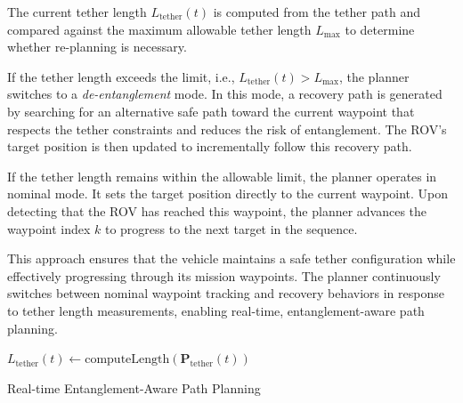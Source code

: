 The current tether length \(L_{\text{tether}}(t)\) is computed from the tether path and compared against the maximum allowable tether length \(L_{\max}\) to determine whether re-planning is necessary.

If the tether length exceeds the limit, i.e., \( L_{\text{tether}}(t) > L_{\max} \), the planner switches to a \emph{de-entanglement} mode. In this mode, a recovery path is generated by searching for an alternative safe path toward the current waypoint that respects the tether constraints and reduces the risk of entanglement. The ROV’s target position is then updated to incrementally follow this recovery path.

If the tether length remains within the allowable limit, the planner operates in nominal mode. It sets the target position directly to the current waypoint. Upon detecting that the ROV has reached this waypoint, the planner advances the waypoint index \(k\) to progress to the next target in the sequence.

This approach ensures that the vehicle maintains a safe tether configuration while effectively progressing through its mission waypoints. The planner continuously switches between nominal waypoint tracking and recovery behaviors in response to tether length measurements, enabling real-time, entanglement-aware path planning.



\begin{algorithm}[t]
\LinesNotNumbered  %
\BlankLine
{}
$L_{\text{tether}}(t) \gets \text{computeLength}(\mathbf{P}_{\mathrm{tether}}(t))$\;
\BlankLine
\If{$L_{\mathrm{tether}}(t) > L_{\max}$}{
    \tcp{De-entanglement Mode: Search for recovery path}
    $\mathbf{P}_{\text{safe}} \gets \text{deEntanglementPathSearch}(\mathbf{P}_{\mathrm{tether}}(t), \mathbf{W}[k], L_{\max})$\;
    \BlankLine
        $\mathbf{p}_{\text{target}} \gets \text{followRecoveryPath}(\mathbf{P}_{\text{safe}}, \mathbf{p}_{\text{rov}}(t))$\;
    }
\BlankLine
{}\;
\caption{Real-time Entanglement-Aware Path Planning}
\label{alg:main_loop}
\end{algorithm}




